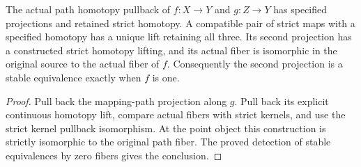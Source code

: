 \begin{proposition}
  \leanok
  The actual path homotopy pullback of $f:X\to Y$ and $g:Z\to Y$ has specified projections and retained strict homotopy. A compatible pair of strict maps with a specified homotopy has a unique lift retaining all three. Its second projection has a constructed strict homotopy lifting, and its actual fiber is isomorphic in the original source to the actual fiber of $f$. Consequently the second projection is a stable equivalence exactly when $f$ is one.
\end{proposition}
\begin{proof}
  Pull back the mapping-path projection along $g$. Pull back its explicit continuous homotopy lift, compare actual fibers with strict kernels, and use the strict kernel pullback isomorphism. At the point object this construction is strictly isomorphic to the original path fiber. The proved detection of stable equivalences by zero fibers gives the conclusion.
  \leanok
\end{proof}

